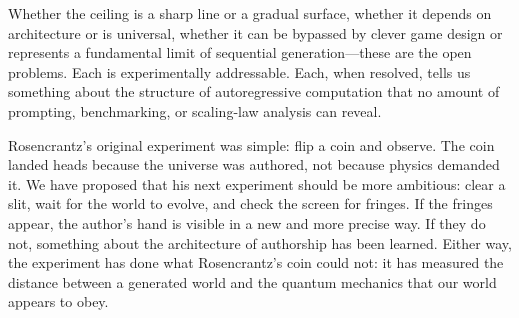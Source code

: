 \documentclass[12pt,a4paper]{article}
\theoremstyle{definition}
\theoremstyle{remark}
\begin{document}
Whether the ceiling is a sharp line or a gradual surface, whether it depends on architecture or is universal, whether it can be bypassed by clever game design or represents a fundamental limit of sequential generation---these are the open problems.  Each is experimentally addressable.  Each, when resolved, tells us something about the structure of autoregressive computation that no amount of prompting, benchmarking, or scaling-law analysis can reveal.

Rosencrantz's original experiment was simple: flip a coin and observe.  The coin landed heads because the universe was authored, not because physics demanded it.  We have proposed that his next experiment should be more ambitious: clear a slit, wait for the world to evolve, and check the screen for fringes.  If the fringes appear, the author's hand is visible in a new and more precise way.  If they do not, something about the architecture of authorship has been learned.  Either way, the experiment has done what Rosencrantz's coin could not: it has measured the distance between a generated world and the quantum mechanics that our world appears to obey.



\end{document}
